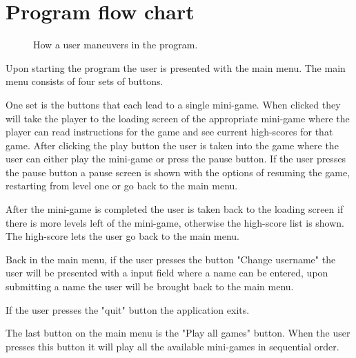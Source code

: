 
\section{Program flow chart}

\begin{figure}[ht]
	\capstart
	\def\svgwidth{\textwidth}
	
	\caption[Program flow chart]{How a user maneuvers in the program.}
	\label{fig:program_flow_chart}
\end{figure}

Upon starting the program the user is presented with the main menu.
The main menu consists of four sets of buttons.

One set is the buttons that each lead to a single mini-game. 
When clicked they will take the player to the loading screen of the appropriate mini-game where the player can read instructions for the game and see current high-scores for that game.
After clicking the play button the user is taken into the game where the user can either play the mini-game or press the pause button.
If the user presses the pause button a pause screen is shown with the options of resuming the game, restarting from level one or go back to the main menu.

After the mini-game is completed the user is taken back to the loading screen if there is more levels left of the mini-game, otherwise the high-score list is shown.
The high-score lets the user go back to the main menu.

Back in the main menu, if the user presses the button "Change username" the user will be presented with a input field where a name can be entered, upon submitting a name the user will be brought back to the main menu.

If the user presses the "quit" button the application exits.

The last button on the main menu is the "Play all games" button. When the user presses this button it will play all the available mini-games in sequential order.
